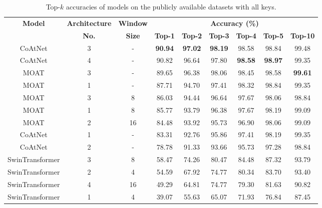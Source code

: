 \documentclass[a4paper,11pt,twoside]{report}
\theoremstyle{definition}
\begin{document}
\begin{table}[h!]
\centering
\caption{Top-$k$ accuracies of models on the publicly available datasets with all keys.}
\begin{adjustbox}{max width=\textwidth}
\begin{tabular}{c|c|c|cccccc}
\hline
\textbf{Model} & \textbf{Architecture} & \textbf{Window} & \multicolumn{6}{c}{\textbf{Accuracy (\%)}} \\
\cline{4-9}
 & \textbf{No.} & \textbf{Size} & \textbf{Top-1} & \textbf{Top-2} & \textbf{Top-3} & \textbf{Top-4} & \textbf{Top-5} & \textbf{Top-10} \\
\hline
CoAtNet & 3 & - & \textbf{90.94} & \textbf{97.02} & \textbf{98.19} & 98.58 & 98.84 & 99.48 \\
CoAtNet & 4 & - & 90.82 & 96.64 & 97.80 & \textbf{98.58} & \textbf{98.97} & 99.35 \\
MOAT & 3 & - & 89.65 & 96.38 & 98.06 & 98.45 & 98.58 & \textbf{99.61} \\
MOAT & 1 & - & 87.71 & 94.70 & 97.41 & 98.32 & 98.84 & 99.35 \\
MOAT & 3 & 8 & 86.03 & 94.44 & 96.64 & 97.67 & 98.06 & 98.84 \\
MOAT & 1 & 8 & 85.77 & 93.79 & 96.38 & 97.67 & 98.19 & 99.09 \\
MOAT & 2 & 16 & 84.48 & 93.92 & 95.73 & 96.90 & 98.06 & 99.09 \\
CoAtNet & 1 & - & 83.31 & 92.76 & 95.86 & 97.41 & 98.19 & 99.35 \\
CoAtNet & 2 & - & 78.78 & 91.33 & 93.66 & 95.73 & 97.28 & 98.84 \\
SwinTransformer & 3 & 8 & 58.47 & 74.26 & 80.47 & 84.48 & 87.32 & 93.79 \\
SwinTransformer & 2 & 4 & 54.59 & 67.92 & 74.77 & 80.34 & 83.70 & 93.40 \\
SwinTransformer & 4 & 16 & 49.29 & 64.81 & 74.77 & 79.30 & 81.63 & 90.82 \\
SwinTransformer & 1 & 4 & 39.07 & 55.63 & 65.07 & 71.93 & 76.84 & 87.45 \\
\hline
\end{tabular}
\end{adjustbox}
\end{table}
\end{document}
